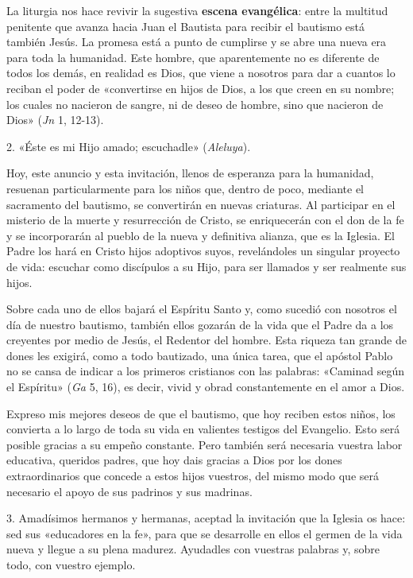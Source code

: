 \documentclass[]{article}
\begin{document}
La liturgia nos hace revivir la sugestiva \textbf{escena evangélica}:
entre la multitud penitente que avanza hacia Juan el Bautista para
recibir el bautismo está también Jesús. La promesa está a punto de
cumplirse y se abre una nueva era para toda la humanidad. Este hombre,
que aparentemente no es diferente de todos los demás, en realidad es
Dios, que viene a nosotros para dar a cuantos lo reciban el poder de
«convertirse en hijos de Dios, a los que creen en su nombre; los cuales
no nacieron de sangre, ni de deseo de hombre, sino que nacieron de Dios»
(\emph{Jn} 1, 12-13).

2. «Éste es mi Hijo amado; escuchadle» (\emph{Aleluya}).

Hoy, este anuncio y esta invitación, llenos de esperanza para la
humanidad, resuenan particularmente para los niños que, dentro de poco,
mediante el sacramento del bautismo, se convertirán en nuevas criaturas.
Al participar en el misterio de la muerte y resurrección de Cristo, se
enriquecerán con el don de la fe y se incorporarán al pueblo de la nueva
y definitiva alianza, que es la Iglesia. El Padre los hará en Cristo
hijos adoptivos suyos, revelándoles un singular proyecto de vida:
escuchar como discípulos a su Hijo, para ser llamados y ser realmente
sus hijos.

Sobre cada uno de ellos bajará el Espíritu Santo y, como sucedió con
nosotros el día de nuestro bautismo, también ellos gozarán de la vida
que el Padre da a los creyentes por medio de Jesús, el Redentor del
hombre. Esta riqueza tan grande de dones les exigirá, como a todo
bautizado, una única tarea, que el apóstol Pablo no se cansa de indicar
a los primeros cristianos con las palabras: «Caminad según el Espíritu»
(\emph{Ga} 5, 16), es decir, vivid y obrad constantemente en el amor a
Dios.

Expreso mis mejores deseos de que el bautismo, que hoy reciben estos
niños, los convierta a lo largo de toda su vida en valientes testigos
del Evangelio. Esto será posible gracias a su empeño constante. Pero
también será necesaria vuestra labor educativa, queridos padres, que hoy
dais gracias a Dios por los dones extraordinarios que concede a estos
hijos vuestros, del mismo modo que será necesario el apoyo de sus
padrinos y sus madrinas.

3. Amadísimos hermanos y hermanas, aceptad la invitación que la Iglesia
os hace: sed sus «educadores en la fe», para que se desarrolle en ellos
el germen de la vida nueva y llegue a su plena madurez. Ayudadles con
vuestras palabras y, sobre todo, con vuestro ejemplo.
\end{document}
